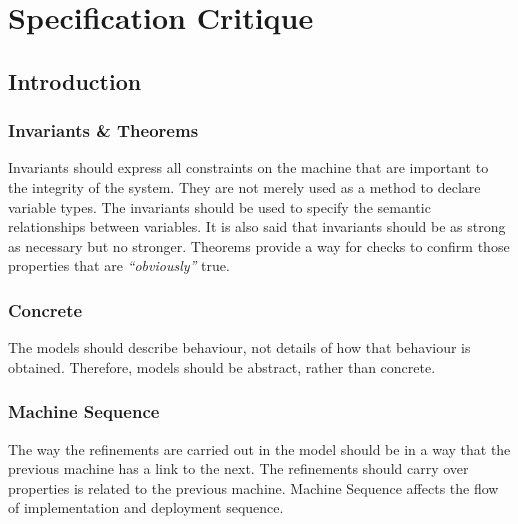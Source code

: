 
\def\mytitle{Specification Critique}
\def\myauthor{Group 03}
\def\email{se2020.grp03@cse.unsw.edu.au}
\def\mydate{05 August 2012}
\def\latexmode{article}

 \pagebreak 

 \tableofcontents 

 \pagebreak 

\chapter{Specification Critique}
\label{specificationcritique}

\section{Introduction}
\label{introduction}

\subsection{Invariants \& Theorems}
\label{invariantstheorems}

Invariants should express all constraints on the machine that are important to the integrity of the system. They are not merely used as a method to declare variable types. The invariants should be used to specify the semantic relationships between variables. It is also said that invariants should be as strong as necessary but no stronger. Theorems provide a way for checks to confirm those properties that are \emph{``obviously''} true. 

\subsection{Concrete}
\label{concrete}

The models should describe behaviour, not details of how that behaviour is obtained. Therefore, models should be abstract, rather than concrete.

\subsection{Machine Sequence}
\label{machinesequence}

The way the refinements are carried out in the model should be in a way that the previous machine has a link to the next. The refinements should carry over properties is related to the previous machine. Machine Sequence affects the flow of implementation and deployment sequence.

